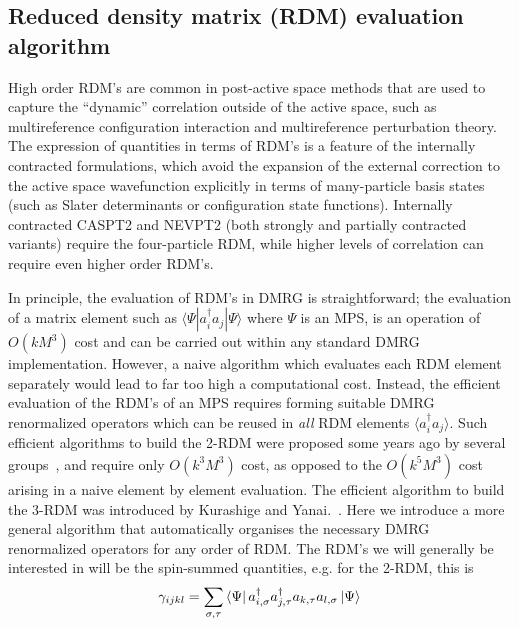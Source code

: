 \subsection{Reduced density matrix (RDM) evaluation algorithm}

High order RDM's are common in post-active space methods that are used
to capture the ``dynamic'' correlation outside of the active space, such as multireference configuration interaction\cite{buenker_individualized_1974} and multireference perturbation theory\cite{andersson_second-order_1990, angeli_n-electron_2002}. 
The expression of quantities in terms of RDM's is a feature of the internally contracted formulations,
which avoid the expansion of the external correction to the active space wavefunction explicitly in terms of many-particle basis states (such as Slater determinants
or configuration state functions). Internally contracted CASPT2\cite{andersson_second-order_1990} and NEVPT2\cite{angeli_n-electron_2002} (both strongly 
and partially contracted variants) require the four-particle RDM, while
 higher levels of correlation can require even higher order RDM's.

In principle, the evaluation of RDM's in DMRG is straightforward; the evaluation of a matrix element such as $\langle \Psi|a^\dag_i a_j |\Psi\rangle$ where $\Psi$
is an MPS, is an operation of $O(k M^3)$ cost and can be carried out 
within any standard DMRG implementation. However, a naive algorithm which 
evaluates each RDM element separately would lead to far too high a computational cost. 
Instead, the efficient evaluation of the RDM's of an MPS requires forming suitable DMRG renormalized operators which can be reused in {\it all} RDM elements $\langle a^\dagger_i a_j \rangle$. 
Such efficient algorithms to build the 2-RDM were proposed some years ago by several groups~\cite{ghosh_orbital_2008,zgid_obtaining_2008}, and require only $O(k^3 M^3)$ cost, as opposed to the $O(k^5 M^3)$
cost arising in a naive element by element evaluation. The efficient algorithm to build the 3-RDM was introduced by Kurashige and Yanai.~\cite{kurashige_second-order_2011}.
Here we introduce a more general algorithm that automatically organises the necessary DMRG renormalized operators for any order of RDM. 
The RDM's we will generally be interested in will be the
spin-summed quantities, e.g. for the 2-RDM, this is
\begin{equation}
\gamma_{ijkl}=\sum_{\sigma,\tau} \bra{\Psi}a^\dagger_{i,\sigma}a^\dagger_{j,\tau}a_{k,\tau}a_{l,\sigma}\ket{\Psi}
\end{equation}


